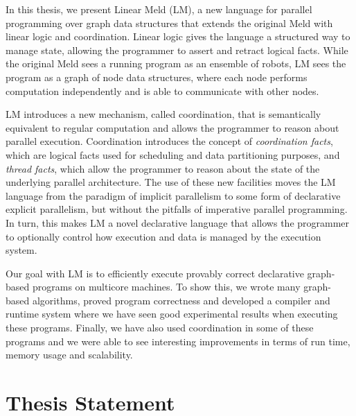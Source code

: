 In this thesis, we present Linear Meld (LM), a new language for parallel
programming over graph data structures that extends the original Meld with
linear logic and coordination. Linear logic gives the language a structured way
to manage state, allowing the programmer to assert and retract logical facts.
While the original Meld sees a running program as an ensemble of robots, LM sees
the program as a graph of node data structures, where each node performs
computation independently and is able to communicate with other nodes.

LM introduces a new mechanism, called coordination, that is semantically
equivalent to regular computation and allows the programmer to reason about
parallel execution. Coordination introduces the concept of \emph{coordination
facts}, which are logical facts used for scheduling and data partitioning
purposes, and \emph{thread facts}, which allow the programmer to reason about
the state of the underlying parallel architecture. The use of these new
facilities moves the LM language from the paradigm of implicit parallelism to
some form of declarative explicit parallelism, but without the pitfalls of
imperative parallel programming. In turn, this makes LM a novel declarative
language that allows the programmer to optionally control how execution and data
is managed by the execution system.

Our goal with LM is to efficiently execute provably correct declarative
graph-based programs on multicore machines. To show this, we wrote many
graph-based algorithms, proved program correctness and developed a compiler and
runtime system where we have seen good experimental results when executing these
programs. Finally, we have also used coordination in some of these programs and
we were able to see interesting improvements in terms of run time, memory usage
and scalability.

\section{Thesis Statement}



